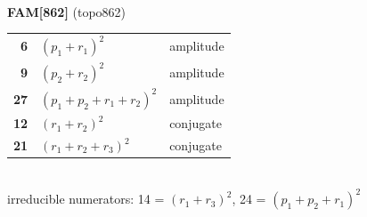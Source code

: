 \documentclass[10pt]{article}
\begin{document}
\begin{minipage}[t]{0.48\textwidth}
{}\\[2mm]\textbf{FAM[862]} (topo862)\\[2pt]{\footnotesize\begin{tabular}{@{}r@{\ \ }l@{\ \ }l@{}}\textbf{6} & $(p_1+r_1)^2$ & amplitude\\
\textbf{9} & $(p_2+r_2)^2$ & amplitude\\
\textbf{27} & $(p_1+p_2+r_1+r_2)^2$ & amplitude\\
\textbf{12} & $(r_1+r_2)^2$ & conjugate\\
\textbf{21} & $(r_1+r_2+r_3)^2$ & conjugate\\\end{tabular}}\\[2pt]{\scriptsize irreducible numerators: 14 = $(r_1+r_3)^2$, 24 = $(p_1+p_2+r_1)^2$}\end{minipage}\hfill%
\end{document}
